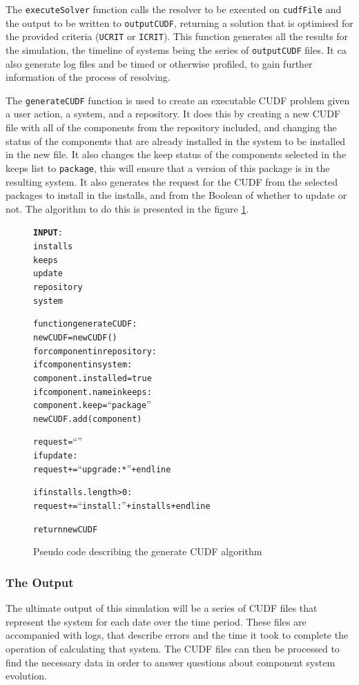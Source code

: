 The \verb+executeSolver+ function calls the resolver to be executed on \verb+cudfFile+ and the output to be written to \verb+outputCUDF+, 
returning a solution that is optimised for the provided criteria (\verb+UCRIT+ or \verb+ICRIT+).
This function generates all the results for the simulation, the timeline of systems being the series of \verb+outputCUDF+ files.
It ca also generate log files and be timed or otherwise profiled, to gain further information of the process of resolving.

The \verb+generateCUDF+ function is used to create an executable CUDF problem given a user action, a system, and a repository.
It does this by creating a new CUDF file with all of the components from the repository included, 
and changing the status of the components that are already installed in the system to be installed in the new file.
It also changes the keep status of the components selected in the keeps list to \verb+package+, this will ensure that a version of this package is in the resulting system.
It also generates the request for the CUDF from the selected packages to install in the installs,
and from the Boolean of whether to update or not.
The algorithm to do this is presented in the figure \ref{generateCUDF}.

\begin{figure}[htp]
\begin{center}
\begin{alltt}
\textbf{INPUT}:
installs
keeps
update
repository
system


function generateCUDF:
    newCUDF = new CUDF()
    for component in repository:
        if component in system:
            component.installed = true
            if component.name in keeps:
                component.keep = ``package''
        newCUDF.add(component)
    
    request = ``''
    if update:
        request += ``upgrade: *'' + endline
        
    if installs.length > 0:
        request += ``install: ''  + installs + endline
    
    return newCUDF
\end{alltt}
\caption[Generate CUDF Pseudo Code]{Pseudo code describing the generate CUDF algorithm}
\label{generateCUDF}
\end{center}
\end{figure}


\subsubsection{The Output}
The ultimate output of this simulation will be a series of CUDF files that represent the system for each date over the time period.
These files are accompanied with logs, that describe errors and the time it took to complete the operation of calculating that system.
The CUDF files can then be processed to find the necessary data in order to answer questions about component system evolution.

